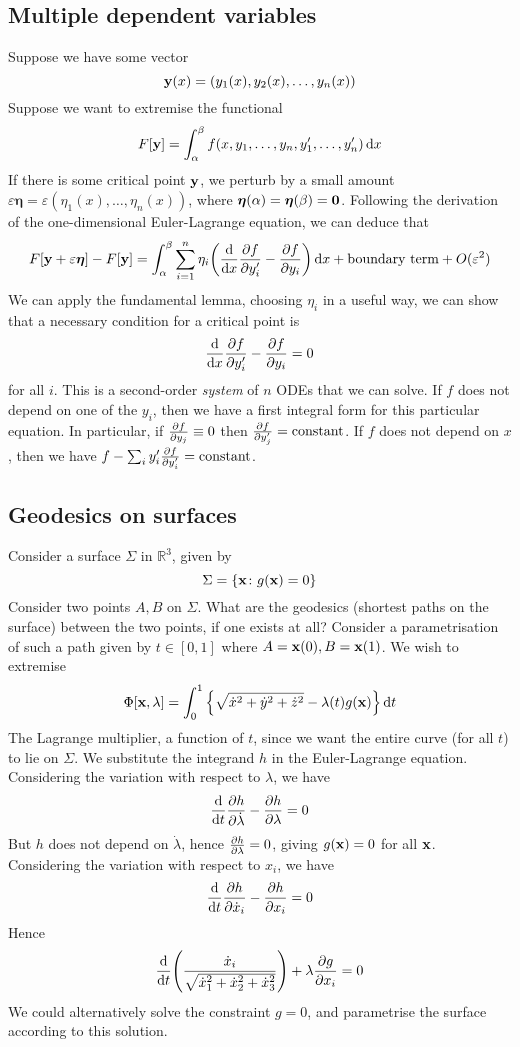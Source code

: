 \subsection{Multiple dependent variables}
Suppose we have some vector
\[
	\vb y(x) = (y_1(x), y_2(x), \dots, y_n(x))
\]
Suppose we want to extremise the functional
\[
	F[\vb y] = \int_\alpha^\beta f(x, y_1, \dots, y_n, y'_1, \dots, y'_n) \dd{x}
\]
If there is some critical point \( \vb y \), we perturb by a small amount \( \varepsilon\bm \eta = \varepsilon(\eta_1(x), \dots, \eta_n(x)) \), where \( \bm\eta(\alpha) = \bm\eta(\beta) = \vb 0 \).
Following the derivation of the one-dimensional Euler-Lagrange equation, we can deduce that
\[
	F[\vb y + \varepsilon \bm \eta] - F[\vb y] = \int_\alpha^\beta \sum_{i=1}^n \eta_i \qty(\dv{x}\pdv{f}{y_i'} - \pdv{f}{y_i})\dd{x} + \text{boundary term} + O(\varepsilon^2)
\]
We can apply the fundamental lemma, choosing \( \eta_i \) in a useful way, we can show that a necessary condition for a critical point is
\[
	\dv{x}\pdv{f}{y_i'} - \pdv{f}{y_i} = 0
\]
for all \( i \).
This is a second-order \textit{system} of \( n \) ODEs that we can solve.
If \( f \) does not depend on one of the \( y_i \), then we have a first integral form for this particular equation.
In particular, if \( \pdv{f}{y_j} \equiv 0 \) then \( \pdv{f}{y_j'} = \text{constant} \).
If \( f \) does not depend on \( x \), then we have \( f - \sum_i y_i' \pdv{f}{y_i'} = \text{constant} \).

\subsection{Geodesics on surfaces}
Consider a surface \( \Sigma \) in \( \mathbb R^3 \), given by
\[
	\Sigma = \qty{ \vb x \colon g(\vb x) = 0 }
\]
Consider two points \( A, B \) on \( \Sigma \).
What are the geodesics (shortest paths on the surface) between the two points, if one exists at all?
Consider a parametrisation of such a path given by \( t \in [0, 1] \) where \( A = \vb x(0), B = \vb x(1) \).
We wish to extremise
\[
	\Phi[\vb x, \lambda] = \int_0^1 \qty{ \sqrt{\dot x^2 + \dot y^2 + \dot z^2} - \lambda(t) g(\vb x) } \dd{t}
\]
The Lagrange multiplier, a function of \( t \), since we want the entire curve (for all \( t \)) to lie on \( \Sigma \).
We substitute the integrand \( h \) in the Euler-Lagrange equation.
Considering the variation with respect to \( \lambda \), we have
\[
	\dv{t} \pdv{h}{\dot\lambda} - \pdv{h}{\lambda} = 0
\]
But \( h \) does not depend on \( \dot\lambda \), hence \( \pdv{h}{\lambda} = 0 \), giving \( g(\vb x) = 0 \) for all \( \vb x \).
Considering the variation with respect to \( x_i \), we have
\[
	\dv{t} \pdv{h}{\dot x_i} - \pdv{h}{x_i} = 0
\]
Hence
\[
	\dv{t}\qty(\frac{\dot x_i}{\sqrt{\dot x_1^2 + \dot x_2^2 + \dot x_3^2}}) + \lambda \pdv{g}{x_i} = 0
\]
We could alternatively solve the constraint \( g = 0 \), and parametrise the surface according to this solution.

